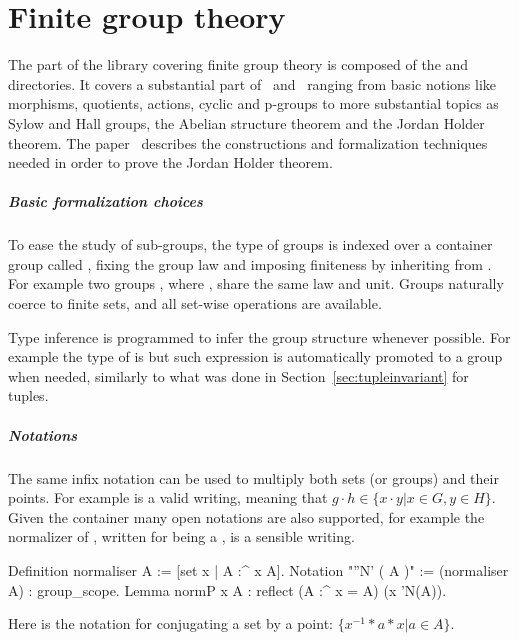 \chapter{Finite group theory}

The part of the library covering finite group theory is composed of
the  and  directories.  It covers a substantial
part of~\cite{gorenstein2007finite} and~\cite{9781139175319} ranging from
basic notions like morphisms, quotients, actions, cyclic and p-groups to more
substantial topics as Sylow and Hall groups, the Abelian
structure theorem and the Jordan Holder theorem.
The paper~\cite{DBLP:conf/mkm/Mahboubi13}
describes the constructions and formalization techniques
needed in order to prove the Jordan Holder theorem.

\paragraph{Basic formalization choices} To ease the study of sub-groups,
the type of groups is indexed over a container group called
, fixing the group law and imposing finiteness by
inheriting from .
For example two groups ,
where , share the same law and unit.  Groups
naturally coerce to finite sets, and all set-wise operations are available.

Type inference is programmed to infer the group structure whenever possible.
For example the type of  is  but such expression
is automatically promoted to a group when needed, similarly to what 
was done in Section~\ref{sec:tupleinvariant} for tuples.

\paragraph{Notations} The same infix \C{*} notation can be used to
multiply both sets (or groups) and their points.  For example
 is a valid writing, meaning that
$g\cdot h \in \{ x\cdot y | x \in G, y \in H\}$.  Given the 
container many open notations are also supported, for example the normalizer
of , written  for  being a , is a sensible
writing.

\begin{coq}{}{}
Definition normaliser A := [set x | A :^ x \subset A].
Notation "''N' ( A )" := (normaliser A) : group_scope.
Lemma normP x A : reflect (A :^ x = A) (x \in 'N(A)).
\end{coq}
Here \C{:^} is the notation for conjugating a set by a point:
$\{x^{-1}*a*x | a\in A\}$.

